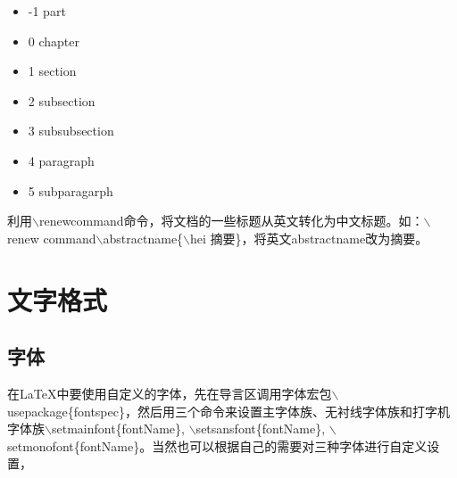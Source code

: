 \documentclass[12pt]{book}
\begin{document}
\begin{center}
	
	\begin{itemize}
		\item -1 part                    
		\item  0 chapter               
		\item  1 section                
		\item  2 subsection          
		\item  3 subsubsection     
		\item  4 paragraph            
		\item  5 subparagarph   
	\end{itemize}

\end{center}


利用$\backslash$renewcommand命令，将文档的一些标题从英文转化为中文标题。如：$\backslash$renew command$\backslash$abstractname\{$\backslash$hei 摘要\}，将英文abstractname改为摘要。

%


\section{文字格式}

\subsection{字体}

在LaTeX中要使用自定义的字体，先在导言区调用字体宏包$\backslash$usepackage\{fontspec\}，然后用三个命令来设置主字体族、无衬线字体族和打字机字体族$\backslash$setmainfont\{fontName\}, $\backslash$setsansfont\{fontName\}, $\backslash$setmonofont\{fontName\}。当然也可以根据自己的需要对三种字体进行自定义设置，

\end{document}
